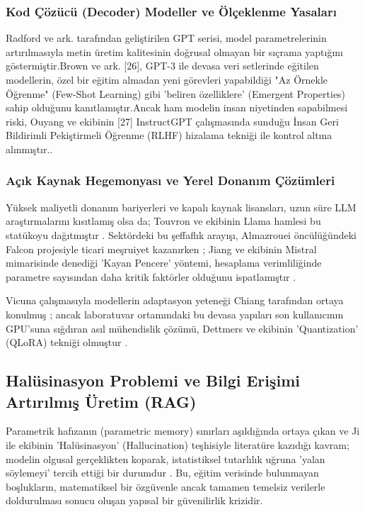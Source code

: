 \documentclass[12pt,a4paper]{report}
\begin{document}
\subsubsection{Kod Çözücü (Decoder) Modeller ve Ölçeklenme Yasaları}
Radford ve ark. tarafından geliştirilen GPT serisi, model parametrelerinin artırılmasıyla metin üretim kalitesinin doğrusal olmayan bir sıçrama yaptığını göstermiştir\cite{radford2019language}.Brown ve ark. [26], GPT-3 ile devasa veri setlerinde eğitilen modellerin, özel bir eğitim almadan yeni görevleri yapabildiği "Az Örnekle Öğrenme" (Few-Shot Learning) gibi 'beliren özelliklere' (Emergent Properties) sahip olduğunu kanıtlamıştır\cite{brown2020language}.Ancak ham modelin insan niyetinden sapabilmesi riski, Ouyang ve ekibinin [27] InstructGPT çalışmasında sunduğu İnsan Geri Bildirimli Pekiştirmeli Öğrenme (RLHF) hizalama tekniği ile kontrol altına alınmıştır.\cite{ouyang2022training}.

\subsubsection{Açık Kaynak Hegemonyası ve Yerel Donanım Çözümleri}
Yüksek maliyetli donanım bariyerleri ve kapalı kaynak lisansları, uzun süre LLM araştırmalarını kısıtlamış olsa da; Touvron ve ekibinin Llama hamlesi bu statükoyu dağıtmıştır \cite{touvron2023llama}. Sektördeki bu şeffaflık arayışı, Almazrouei öncülüğündeki Falcon projesiyle ticari meşruiyet kazanırken \cite{almazrouei2023falcon}; Jiang ve ekibinin Mistral mimarisinde denediği 'Kayan Pencere' yöntemi, hesaplama verimliliğinde parametre sayısından daha kritik faktörler olduğunu ispatlamıştır \cite{jiang2023mistral}. 

Vicuna çalışmasıyla modellerin adaptasyon yeteneği Chiang tarafından ortaya konulmuş \cite{chiang2023vicuna}; ancak laboratuvar ortamındaki bu devasa yapıları son kullanıcının GPU'suna sığdıran asıl mühendislik çözümü, Dettmers ve ekibinin 'Quantization' (QLoRA) tekniği olmuştur \cite{dettmers2024qlora}.

\subsection{Halüsinasyon Problemi ve Bilgi Erişimi Artırılmış Üretim (RAG)}
Parametrik hafızanın (parametric memory) sınırları aşıldığında ortaya çıkan ve Ji ile ekibinin 'Halüsinasyon' (Hallucination) teşhisiyle literatüre kazıdığı kavram; modelin olgusal gerçeklikten koparak, istatistiksel tutarlılık uğruna 'yalan söylemeyi' tercih ettiği bir durumdur \cite{ji2023survey}. Bu, eğitim verisinde bulunmayan boşlukların, matematiksel bir özgüvenle ancak tamamen temelsiz verilerle doldurulması sonucu oluşan yapısal bir güvenilirlik krizidir.
\end{document}

